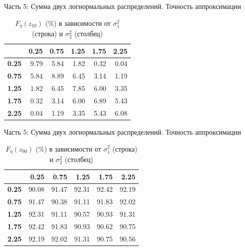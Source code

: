 \documentclass[ucs, notheorems, handout]{beamer}
\begin{document}
	\begin{frame}{Часть 5: Сумма двух логнормальных распределений. Точность аппроксимации}
		
		\begin{table}[!hhh]
			\centering
			\caption{$F_{\eta}(z_{10})$ ($\%$) в зависимости от $\sigma_{1}^{2}$ (строка) и $\sigma_{2}^{2}$ (столбец) }
			\label{tab5}
			\begin{tabular}{rrrrrr}
				\hline
				& \textbf{0.25} & \textbf{0.75} & \textbf{1.25} & \textbf{1.75} & \textbf{2.25} \\ 
				\hline
				\textbf{0.25} & 9.79 & 5.84 & 1.82 & 0.32 & 0.04 \\ 
				\textbf{0.75} & 5.84 & 8.89 & 6.45 & 3.14 & 1.19 \\ 
				\textbf{1.25} & 1.82 & 6.45 & 7.85 & 6.00 & 3.35 \\ 
				\textbf{1.75} & 0.32 & 3.14 & 6.00 & 6.89 & 5.43 \\ 
				\textbf{2.25} & 0.04 & 1.19 & 3.35 & 5.43 & 6.08 \\ 
				\hline
			\end{tabular}
		\end{table}
		
	\end{frame}
	
	\begin{frame}{Часть 5: Сумма двух логнормальных распределений. Точность аппроксимации}
		
		\begin{table}[!hhh]
			\centering
			\caption{$F_{\eta}(z_{90})$ ($\%$) в зависимости от $\sigma_{1}^{2}$ (строка) и $\sigma_{2}^{2}$ (столбец)}
			\label{tab6}
			\begin{tabular}{rrrrrr}
				\hline
				& \textbf{0.25} & \textbf{0.75} & \textbf{1.25} & \textbf{1.75} & \textbf{2.25} \\
				\hline
				\textbf{0.25} & 90.08 & 91.47 & 92.31 & 92.42 & 92.19 \\ 
				\textbf{0.75} & 91.47 & 90.38 & 91.11 & 91.83 & 92.02 \\ 
				\textbf{1.25} & 92.31 & 91.11 & 90.57 & 90.93 & 91.31 \\ 
				\textbf{1.75} & 92.42 & 91.83 & 90.93 & 90.62 & 90.75 \\ 
				\textbf{2.25} & 92.19 & 92.02 & 91.31 & 90.75 & 90.56 \\ 
				\hline
			\end{tabular}
		\end{table}
		
	\end{frame}
	
\end{document}
